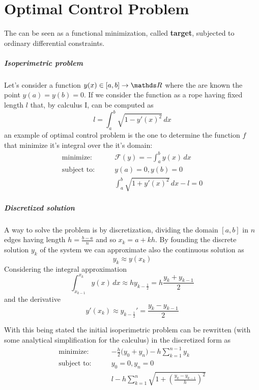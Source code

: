 \chapter{Optimal Control Problem}
	
	The  can be seen as a functional minimization, called \textbf{target}, subjected to ordinary differential constraints.
	
	\paragraph{Isoperimetric problem} Let's consider a function $y (x) \in [a,b]\rightarrow \R$ where the are known the point $y(a) = y(b) = 0$. If we consider the function as a rope having fixed length $l$ that, by calculus I, can be computed as
	\[ l = \int_a^b \sqrt{1- y'(x)^2}\, dx \]
	an example of optimal control problem is the one to determine the function $f$ that minimize it's integral over the it's domain:
	\begin{align*}
		\textrm{minimize:} \qquad & \mathcal F(y) = - \int_a^b y(x)\, dx \\
		\textrm{subject to:} \qquad & y(a) = 0 , y(b) = 0\\ & \int_a^b \sqrt{1+y'(x)^2}\, dx - l = 0
	\end{align*}
	
	\paragraph{Discretized solution} A way to solve the problem is by discretization, dividing the domain $[a,b]$ in $n$ edges having length $h= \frac{b-a}{n}$ and so $x_k = a + k h$. By founding the discrete solution $y_k$ of the system we can approximate also the continuous solution as
	\[ y_k \approx y(x_k) \]
	Considering the integral approximation
	\[ \int_{x_{k-1}}^{x_k} y(x)\, dx \approx h y_{k-\frac 1 2} = h \frac{y_{k} + y_{k-1}}{2} \]
	and the derivative
	\[ y'(x_k) \approx y_{k-\frac 1 2}' = \frac{y_k - y_{k-1}}{2} \]
	
	With this being stated the initial isoperimetric problem can be rewritten (with some analytical simplification for the calculus) in the discretized form as	
	\begin{align*}
		\textrm{minimize:} \qquad & - \frac  h 2\big(y_0+y_n\big) - h \sum_{k=1}^{n-1} y_k \\
		\textrm{subject to:} \qquad & y_0 = 0 , y_n= 0\\ & l - h \sum_{k=1}^{n} \sqrt{1 + \left( \frac{y_k - y_{k-1}}{h} \right)^2}
	\end{align*}

